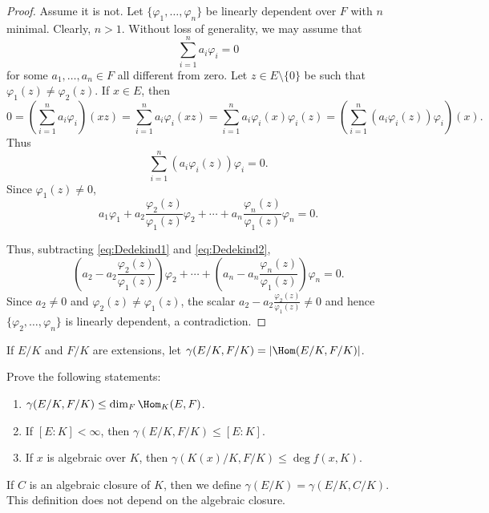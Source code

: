 \begin{proof}
    Assume it is not. Let $\{\varphi_1,\dots,\varphi_n\}$ 
    be linearly dependent over $F$ with $n$ minimal. Clearly, $n>1$. 
    Without loss of generality, we may assume that 
    \begin{equation}
        \label{eq:Dedekind1}
        \sum_{i=1}^n a_i\varphi_i=0
    \end{equation}
    for some $a_1,\dots,a_n\in F$ all different from zero. 
    Let
    $z\in E\setminus\{0\}$ be such that $\varphi_1(z)\ne\varphi_2(z)$. If $x\in E$, then
    \[
    0=\left(\sum_{i=1}^na_i\varphi_i\right)(xz)=\sum_{i=1}^na_i\varphi_i(xz)
    =\sum_{i=1}^na_i\varphi_i(x)\varphi_i(z)
    =\left(\sum_{i=1}^n (a_i\varphi_i(z))\varphi_i\right)(x).
    \]
    Thus 
    \[
        \sum_{i=1}^n (a_i\varphi_i(z))\varphi_i=0.
    \]
    Since $\varphi_1(z)\ne0$, 
    \begin{equation}
    \label{eq:Dedekind2}
        a_1\varphi_1+a_2\frac{\varphi_2(z)}{\varphi_1(z)}\varphi_2+\cdots+a_n\frac{\varphi_n(z)}{\varphi_1(z)}\varphi_n=0.
    \end{equation}

    Thus, 
    subtracting \eqref{eq:Dedekind1} and \eqref{eq:Dedekind2}, 
    \[
    \left(a_2-a_2\frac{\varphi_2(z)}{\varphi_1(z)}\right)\varphi_2
    +\cdots+\left(a_n-a_n\frac{\varphi_n(z)}{\varphi_1(z)}\right)\varphi_n=0.
    \]
    Since $a_2\ne 0$ and $\varphi_2(z)\ne\varphi_1(z)$, 
    the scalar $a_2-a_2\frac{\varphi_2(z)}{\varphi_1(z)}\ne 0$ and hence 
    $\{\varphi_2,\dots,\varphi_n\}$ is linearly dependent, a contradiction. 
\end{proof}

If $E/K$ and $F/K$ are extensions, 
let $\gamma(E/K,F/K)=|\Hom(E/K,F/K)|$. 

\begin{exercise}
Prove the following statements:
\begin{enumerate}
    \item $\gamma(E/K,F/K)\leq\dim_F\Hom_K(E,F)$.
    \item If $[E:K]<\infty$, then $\gamma(E/K,F/K)\leq[E:K]$. 
    \item If $x$ is algebraic over $K$, then $\gamma(K(x)/K,F/K)\leq\deg f(x,K)$.
\end{enumerate}
\end{exercise}

If $C$ is an algebraic closure of $K$,
then we define $\gamma(E/K)=\gamma(E/K,C/K)$. This definition does
not depend on the algebraic closure. 

